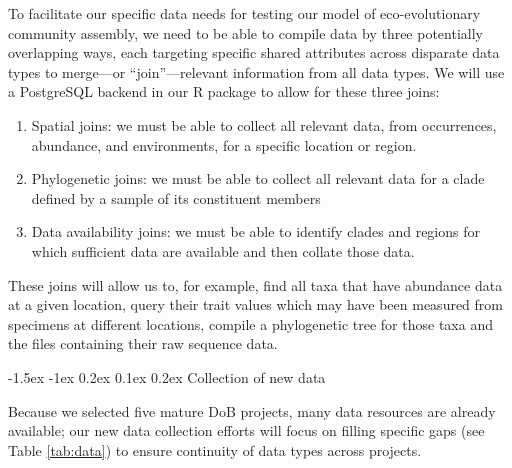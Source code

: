 \documentclass[11pt]{article}
\makeatletter
\renewcommand\subsubsection{\@startsection{subsection}{1}{\z@}%
                                  {-1.5ex \@plus -1ex \@minus 0.2ex}%
                                  {0.1ex \@plus 0.2ex}%
                                  {\normalfont\bfseries}}
\makeatother
\begin{document}
To facilitate our specific data needs for testing our model of
eco-evolutionary community assembly, we need to be able to compile data
by three potentially overlapping ways, each targeting specific shared
attributes across disparate data types to merge---or ``join''---relevant
information from all data types. We will use a PostgreSQL
\cite{Douglas2003-zs} backend in our R package to allow for these three
joins:

\begin{enumerate}
\def\labelenumi{\arabic{enumi}.}
\item
  Spatial joins: we must be able to collect all relevant data, from
  occurrences, abundance, and environments, for a specific location or
  region.
\item
  Phylogenetic joins: we must be able to collect all relevant data for a
  clade defined by a sample of its constituent members
\item
  Data availability joins: we must be able to identify clades and
  regions for which sufficient data are available and then collate those
  data.
\end{enumerate}

These joins will allow us to, for example, find all taxa that have
abundance data at a given location, query their trait values which may
have been measured from specimens at different locations, compile a
phylogenetic tree for those taxa and the files containing their raw
sequence data.

\subsubsection{Collection of new data} \label{collection-of-new-data}

Because we selected five mature DoB projects, many data resources are
already available; our new data collection efforts will focus on
filling specific gaps (see Table \ref{tab:data}) to ensure continuity
of data types across projects.
\end{document}
